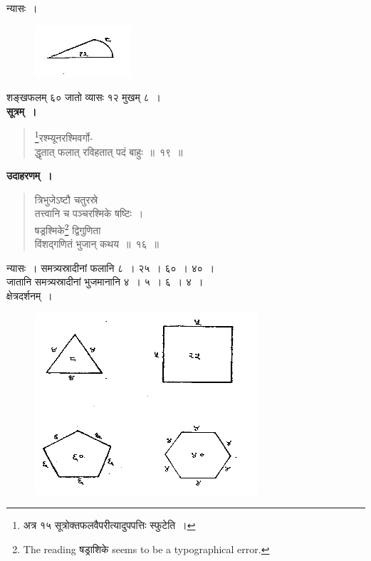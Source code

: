 \documentclass[11pt, openany]{book}
\begin{document}
 न्यासः~। 
\vspace{-2mm}

\begin{figure}[h!]
    \centering
    \includegraphics[scale=0.8]{graphics/capture22.png}
\end{figure}
\vspace{-6mm}

 शङ्खफलम् ६० जातो व्यासः १२ मुखम् ८~। \\

 \textbf{सूत्रम्~।} 
\setcounter{footnote}{0}
\begin{quote}
    \bs 
    \footnote{अत्र १५ सूत्रोक्तफलवैपरीत्यादुपपत्तिः स्फुटेति~। }रश्म्यूनरश्मिवर्गो- \\
    द्धृतात् फलात् रविहतात् पदं बाहुः~॥~१९~॥
\end{quote}
 \vspace{2mm}
 
 \textbf{उदाहरणम्~।} 
\begin{quote}
    \bqt
     त्रिभुजेऽष्टौ चतुरस्रे \\
     तत्त्वानि च पञ्चरश्मिके षष्टिः~।\\
षड्रश्मिके\footnote{The reading षड्राशिके seems to be a typographical error.} द्विगुणिता \\
विंशद्गणितं भुजान् कथय~॥~१६~॥
\end{quote}

\newpage%

न्यासः~। समत्र्यस्रादीनां फलानि ८~। २५~। ६०~। ४०~। \\
\indent जातानि समत्र्यस्रादीनां भुजमानानि ४~। ५~। ६~। ४~। \\
 
\vspace{-2mm}
 क्षेत्रदर्शनम्~। 
\vspace{-2mm}

\begin{figure}[h!]
    \centering
    \includegraphics[scale=0.7]{graphics/capture23.png}
\end{figure}
\vspace{2mm}
\end{document}
